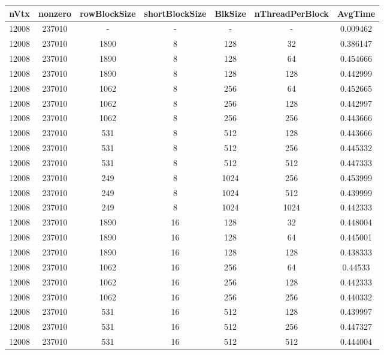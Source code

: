 \documentclass[9pt]{article}
\begin{document}
\SetBgPosition{0.25cm,-5.0cm}
\begin{tabular}{|c|c|c|c|c|c|c| }  
\hline
nVtx  & nonzero  & rowBlockSize  & shortBlockSize  & BlkSize  & nThreadPerBlock  & AvgTime \\
\hline
12008  & 237010  &  -  & -  & -  & -  &0.009462 \\
\hline
12008  & 237010  & 1890  & 8  & 128  & 32  & 0.386147 \\
\hline
12008  & 237010  & 1890  & 8  & 128  & 64  & 0.454666 \\
\hline
12008  & 237010  & 1890  & 8  & 128  & 128  & 0.442999 \\
\hline
12008  & 237010  & 1062  & 8  & 256  & 64  & 0.452665 \\
\hline
12008  & 237010  & 1062  & 8  & 256  & 128  & 0.442997 \\
\hline
12008  & 237010  & 1062  & 8  & 256  & 256  & 0.443666 \\
\hline
12008  & 237010  & 531  & 8  & 512  & 128  & 0.443666 \\
\hline
12008  & 237010  & 531  & 8  & 512  & 256  & 0.445332 \\
\hline
12008  & 237010  & 531  & 8  & 512  & 512  & 0.447333 \\
\hline
12008  & 237010  & 249  & 8  & 1024  & 256  & 0.453999 \\
\hline
12008  & 237010  & 249  & 8  & 1024  & 512  & 0.439999 \\
\hline
12008  & 237010  & 249  & 8  & 1024  & 1024  & 0.442333 \\
\hline
12008  & 237010  & 1890  & 16  & 128  & 32  & 0.448004 \\
\hline
12008  & 237010  & 1890  & 16  & 128  & 64  & 0.445001 \\
\hline
12008  & 237010  & 1890  & 16  & 128  & 128  & 0.438333 \\
\hline
12008  & 237010  & 1062  & 16  & 256  & 64  & 0.44533 \\
\hline
12008  & 237010  & 1062  & 16  & 256  & 128  & 0.442333 \\
\hline
12008  & 237010  & 1062  & 16  & 256  & 256  & 0.440332 \\
\hline
12008  & 237010  & 531  & 16  & 512  & 128  & 0.439997 \\
\hline
12008  & 237010  & 531  & 16  & 512  & 256  & 0.447327 \\
\hline
12008  & 237010  & 531  & 16  & 512  & 512  & 0.444004 \\

\end{tabular}
\end{document}
